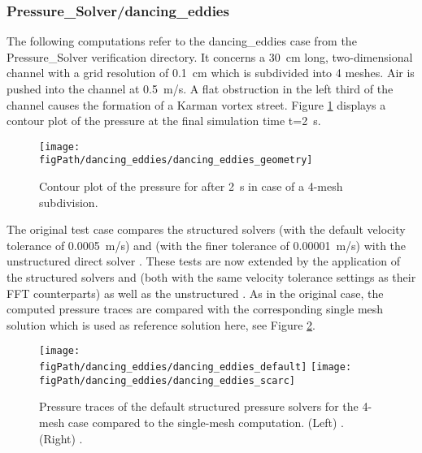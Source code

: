 \newpage
\subsubsection{Pressure\_Solver/dancing\_eddies}
\label{SEC_SCARC_dancing_eddies}

The following computations refer to the {\ct dancing\_eddies} case from the Pressure\_Solver verification directory. It concerns a 30~cm long, two-dimensional channel with a grid resolution of 0.1~cm which is subdivided into 4 meshes. Air is pushed into the channel at 0.5~m/s. A flat obstruction in the left third of the channel causes the formation of a Karman vortex street. Figure \ref{FIG_scarc_dancing_eddies_four} displays a contour plot of the pressure at the final simulation time t=2~s.
\begin{figure}[ht]
\begin{center}
\texttt{[image: \\figPath/dancing\_eddies/dancing\_eddies\_geometry]}
\end{center}
\caption[Contour plot for the 4-mesh {} case]{Contour plot of the pressure for \uscarc{} after 2~s in case of a 4-mesh subdivision.}
\label{FIG_scarc_dancing_eddies_four}
\end{figure}

The original test case compares the structured solvers \fftdefault{} (with the default velocity tolerance of 0.0005~m/s) and \ffttight{} (with the finer tolerance of 0.00001~m/s) with the unstructured direct solver \uglmat{}. These tests are now extended by the application of the structured solvers \scarcdefault{} and \scarctight{} (both with the same velocity tolerance settings as their FFT counterparts) as well as the unstructured \uscarc{}. 
As in the original case, the computed pressure traces are compared with the corresponding single mesh solution which is used as reference solution here, see Figure \ref{FIG_scarc_dancing_eddies_pressure}.

\begin{figure}[ht]
\begin{center}
\texttt{[image: \\figPath/dancing\_eddies/dancing\_eddies\_default]}
\texttt{[image: \\figPath/dancing\_eddies/dancing\_eddies\_scarc]}
\end{center}
\caption[Results of the {} test cases]{Pressure traces of the default structured pressure solvers for the 4-mesh {} case compared to the single-mesh computation. (Left) \fftdefault{}. (Right) \scarcdefault{}.}
\label{FIG_scarc_dancing_eddies_pressure}
\end{figure}

